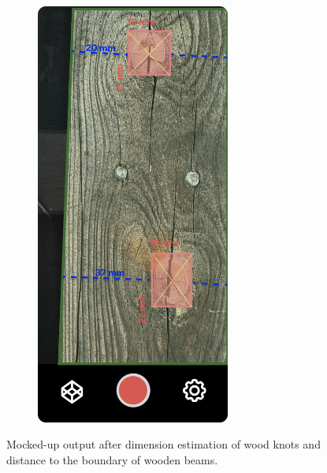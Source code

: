 \begin{figure}[ht]
\begin{subfigure}[b]{0.3\textwidth}
        \includegraphics[width=0.7\textwidth]{Master Thesis/Images/Section_3/Mock/3-Mock5.png}
    \end{subfigure}
  \caption{Mocked-up output after dimension estimation of wood knots and distance to the boundary of wooden beams.}   
    \label{fig:mock3}
\end{figure}  

